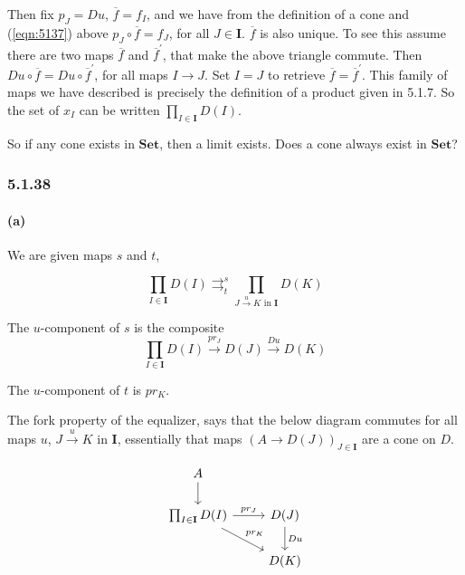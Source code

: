 \documentclass{article}
\begin{document}
Then fix $p_J = Du$, $\overline{f}=f_I$,  and we have from the definition of a cone and (\ref{eqn:5137}) above $p_J \circ \overline{f} = f_J$, for all $J \in \mathbf{I}$. $\overline{f}$ is also unique. To see this assume there are two maps $\overline{f}$ and $\overline{f}^\prime$, that make the above triangle commute. Then $Du \circ \overline{f} = Du \circ  \overline{f}^\prime$, for all maps $I \rightarrow J$. Set $I=J$ to retrieve $\overline{f} = \overline{f}^\prime$. This family of maps we have described is precisely the definition of a product given in 5.1.7.  So the set of $x_I$ can be written $\prod_{I \in \mathbf{I}}D(I)$.

So if any cone exists in $\mathbf{Set}$, then a limit exists. Does a cone always exist in $\mathbf{Set}$?

\subsubsection*{5.1.38}
\paragraph{(a)}

We are given maps $s$ and $t$,

\begin{equation*}
  \prod_{I \in \mathbf{I}} D(I) \mathop{\rightrightarrows}_t^{s} \prod_{J \xrightarrow{u} K \text{ in } \mathbf{I}} D(K)
\end{equation*}

The $u$-component of $s$ is the composite
\begin{equation*}
  \prod_{I \in \mathbf{I}}D(I) \xrightarrow{pr_J} D(J) \xrightarrow{Du} D(K)
\end{equation*}

The $u$-component of $t$ is $pr_K$.

The fork property of the equalizer, says that the below diagram commutes for all maps $u$, $J \xrightarrow{u} K \text{ in } \mathbf{I}$, essentially that maps $(A \rightarrow D(J))_{J \in \mathbf{I}}$ are a cone on $D$.

\begin{equation}
\label{eqn:5138a}
\begin{tikzcd}
  A \arrow{d} &\\
  \prod_{I \in \mathbf{I}}D(I) \arrow{r}{pr_J} \arrow{rd}{pr_K}
  & D(J) \arrow{d}{Du} \\
    & D(K)
  \end{tikzcd}
\end{equation}
\end{document}
